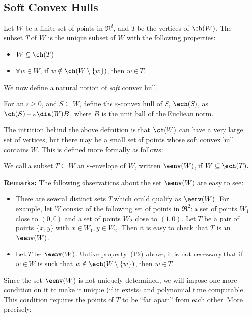 
\subsection{Soft Convex Hulls}
\label{sec:soft}
Let $W$ be a finite set of points in $\Re^d$, and
$T$ be the vertices of $\ch(W)$. The subset $T$ of $W$ is the unique subset of $W$ with the following properties: 
\begin{itemize}
\item[(P1)] $W\subseteq \ch(T)$
\item[(P2)] $\forall w\in W$, if $w\notin \ch(W\setminus \{w\})$, then $w \in T$. 
\end{itemize}



We now define a natural notion of {\em soft} convex hull. 
\begin{defn}\label{soft-CH}
For an $\varepsilon \geq 0$, and $S\subseteq W$, define the $\varepsilon$-convex hull of $S$, $\ech(S)$, as $\ch(S) + \varepsilon \dia(W) B$, where $B$ is the unit ball of the Eucliean norm. 
\end{defn}

 The intuition behind the above definition is that $\ch(W)$ can have a very large set of vertices, but there may be a small set of points whose soft convex hull contains $W$. This is defined more formally as follows: 

\begin{defn}\label{envelope}
We call a subset $T\subseteq W$ an $\varepsilon$-envelope of $W$, written
$\eenv(W)$, if 
$W\subseteq \ech(T).$  
\end{defn} 

\noindent
{\bf Remarks:} The following observations about the set $\eenv(W)$ are easy to see:
\begin{itemize}
\item[(a)] There are several distinct sets $T$ which could qualify as $\eenv(W)$. For example, let $W$ consist of the following set of points in $\Re^2$:  a set of points $W_1$ close to $(0,0)$ and a set of points $W_2$ close to $(1,0)$. Let $T$ be a pair of points $\{x,y\}$ with $x \in W_1, y \in W_2$. Then it is easy to check that $T$ is an $\eenv(W)$. 
\item[(b)] Let $T$ be $\eenv(W)$. Unlike property~(P2) above, it is not necessary that if $w \in W$ is such that $w \notin \ech(W \setminus \{w\})$, then $w \in T$. 
 \end{itemize}

Since the set $\eenv(W)$ is not uniquely determined, we will impose one more condition on it to make it unique (if it exists) and polynomial time computable. This condition requires
the points of $T$ to be ``far apart'' from each other. More precisely:

